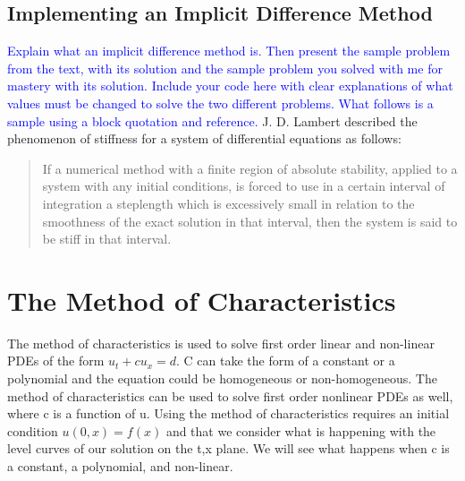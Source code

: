 \documentclass{article}
\newcommand{\red}[1]{\textcolor{red}{#1}}
\newcommand{\blue}[1]{\textcolor{blue}{#1}}
\begin{document}
    
    
    

\subsection{Implementing an Implicit Difference Method}
\blue{Explain what an implicit difference method is. Then present the sample problem from the text, with its solution and the sample problem you solved with me for mastery with its solution. Include your code here with clear explanations of what values must be changed to solve the two different problems.
What follows is a sample using a block quotation and reference.}
J. D. Lambert described the phenomenon of stiffness for a system of
differential equations as follows:
\begin{quote} If a numerical method with a finite region of absolute stability,
    applied to a system with any initial conditions, is forced to use in a
    certain interval of integration a steplength which is excessively small in
    relation to the smoothness of the exact solution in that interval, then the
    system is said to be stiff in that interval. \cite{wikistiff}
    \end{quote}
    
\section{The Method of Characteristics}
The method of characteristics is used to solve first order linear and non-linear PDEs of the form $u_t+cu_x = d$.
C can take the form of a constant or a polynomial and the equation could be homogeneous or non-homogeneous. The method of characteristics can be used to solve first order nonlinear PDEs as well, where c is a function of u. Using the method of characteristics requires an initial condition $u(0,x)=f(x)$ and that we consider what is happening with the level curves of our solution on the t,x plane. We will see what happens when c is a constant, a polynomial, and non-linear. 
\end{document}
